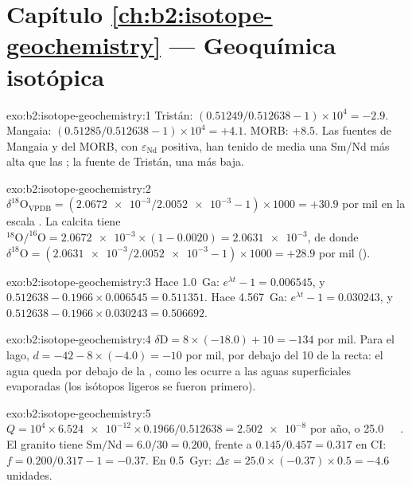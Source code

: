 \section*{Capítulo \ref{ch:b2:isotope-geochemistry} --- Geoquímica isotópica}

\begin{solution}{exo:b2:isotope-geochemistry:1}
Tristán: $(0.51249/0.512638 - 1)\times10^4 = -2.9$. Mangaia: $(0.51285/0.512638 -
1)\times10^4 = +4.1$. MORB: $+8.5$. Las fuentes de Mangaia y del MORB, con
$\varepsilon_{\mathrm{Nd}}$ positiva, han tenido de media una Sm/Nd más alta que las ; la
fuente de Tristán, una más baja.
\end{solution}

\begin{solution}{exo:b2:isotope-geochemistry:2}
$\delta^{18}\mathrm{O}_{\mathrm{VPDB}} = (\num{2.0672e-3}/\num{2.0052e-3} - 1)\times1000 =
+30.9$ por mil en la escala . La calcita tiene $^{18}\mathrm{O}/^{16}\mathrm{O} =
\num{2.0672e-3}\times(1 - 0.0020) = \num{2.0631e-3}$, de donde $\delta^{18}\mathrm{O} =
(\num{2.0631e-3}/\num{2.0052e-3} - 1)\times1000 = +28.9$ por mil ().
\end{solution}

\begin{solution}{exo:b2:isotope-geochemistry:3}
Hace \qty{1.0}{Ga}: $e^{\lambda t} - 1 = 0.006545$, y $0.512638 - 0.1966\times0.006545 =
0.511351$. Hace \qty{4.567}{Ga}: $e^{\lambda t}-1 = 0.030243$, y $0.512638 -
0.1966\times0.030243 = 0.506692$.
\end{solution}

\begin{solution}{exo:b2:isotope-geochemistry:4}
$\delta\mathrm{D} = 8\times(-18.0) + 10 = -134$ por mil. Para el lago, $d = -42 -
8\times(-4.0) = -10$ por mil, por debajo del 10 de la recta: el agua queda por debajo de la , como les ocurre a las aguas superficiales evaporadas (los isótopos ligeros se fueron primero).
\end{solution}

\begin{solution}{exo:b2:isotope-geochemistry:5}
$Q = 10^4\times\num{6.524e-12}\times0.1966/0.512638 = \num{2.502e-8}$ por año, o
\qty{25.0}{\per\giga\year}. El granito tiene $\mathrm{Sm}/\mathrm{Nd} = 6.0/30 = 0.200$,
frente a $0.145/0.457 = 0.317$ en CI: $f = 0.200/0.317 - 1 = -0.37$. En
\qty{0.5}{Gyr}: $\Delta\varepsilon = 25.0\times(-0.37)\times0.5 = -4.6$ unidades.
\end{solution}

